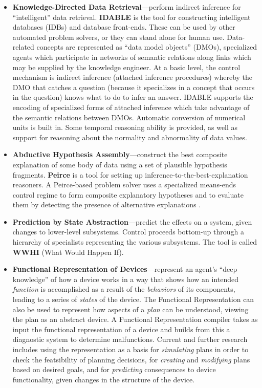 \begin{itemize}
\item {\bf Knowledge-Directed Data Retrieval}---perform indirect
inference for ``intelligent'' data retriev\-al.  {\bf IDABLE} is the
tool for constructing intelligent databases (IDBs) and database
front-ends.  These can be used by other automated problem solvers, or
they can stand alone for human use.  Data-related concepts are
represented as ``data model objects'' (DMOs), specialized agents which
participate in networks of semantic relations along links which may be
supplied by the knowledge engineer.  At a basic level, the control
mechanism is indirect inference (attached inference procedures)
whereby the DMO that catches a question (because it specializes in a
concept that occurs in the question) knows what to do to infer an
answer.  IDABLE supports the encoding of specialized forms of attached
inference which take advantage of the semantic relations between DMOs.
Automatic conversion of numerical units is built in.  Some temporal
reasoning ability is provided, as well as support for reasoning about
the normality and abnormality of data
values.\cite{84-SM-PATREC}

\item {\bf Abductive Hypothesis Assembly}---construct the best
composite explanation of some body of data using a set of plausible
hypothesis fragments.  {\bf Peirce} is a tool for setting up
inference-to-the-best-explanation reasoners.  A Peirce-based problem
solver uses a specialized means-ends control regime to form composite
explanatory hypotheses and to evaluate them by detecting the presence
of alternative explanations \cite{87-JJ-MECHANISM,86-WP-PEIRCE,88-JJ-REDUNCERT,84-JJ-RED,88-AG-CONSYNCOMP}.

\item {\bf Prediction by State Abstraction}---predict the effects
on a system, given changes to lower-level subsystems.  Control
proceeds bottom-up through a hierarchy of specialists representing the
various subsystems.  The tool is called {\bf WWHI} (What Would Happen
If).

\item {\bf Functional Representation of Devices}---represent an
agent's ``deep knowledge'' of how a device works in a way that shows
how an intended {\it function} is accomplished as a result of the {\it
behaviors} of its components, leading to a series of {\it states} of
the device. The Functional Representation can also be used to
represent how aspects of a {\it plan} can be understood, viewing the
plan as an abstract device.  A Functional Representation compiler
takes as input the functional representation of a device and builds
from this a diagnostic system to determine malfunctions.  Current and
further research includes using the representation as a basis for {\it
simulating} plans in order to check the featsibility of planning
decisions, for {\it creating} and {\it modifying} plans based on
desired goals, and for {\it predicting} consequences to device
functionality, given changes in the structure of the device.
\end{itemize}




